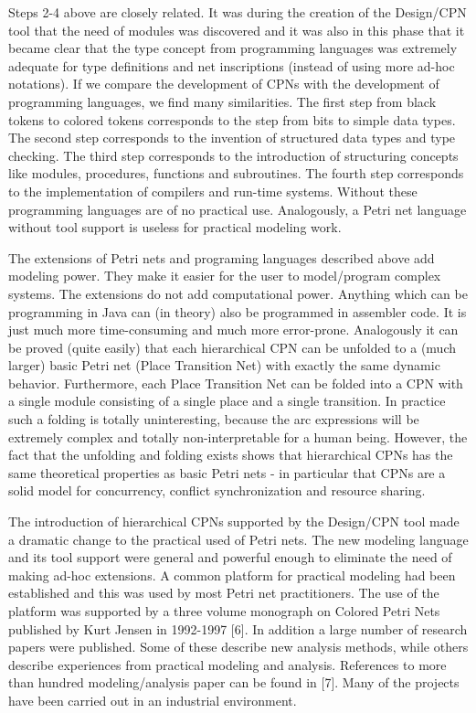 Steps 2-4 above are closely related. It was during the creation of the
Design/CPN tool that the need of modules was discovered and it was
also in this phase that it became clear that the type concept from
programming languages was extremely adequate for type definitions and
net inscriptions (instead of using more ad-hoc notations). If we
compare the development of CPNs with the development of programming
languages, we find many similarities. The first step from black tokens
to colored tokens corresponds to the step from bits to simple data
types. The second step corresponds to the invention of structured data
types and type checking. The third step corresponds to the
introduction of structuring concepts like modules, procedures,
functions and subroutines. The fourth step corresponds to the
implementation of compilers and run-time systems. Without these
programming languages are of no practical use. Analogously, a Petri
net language without tool support is useless for practical modeling
work.

The extensions of Petri nets and programing languages described above
add modeling power. They make it easier for the user to model/program
complex systems. The extensions do not add computational
power. Anything which can be programming in Java can (in theory) also
be programmed in assembler code. It is just much more time-consuming
and much more error-prone. Analogously it can be proved (quite easily)
that each hierarchical CPN can be unfolded to a (much larger) basic
Petri net (Place Transition Net) with exactly the same dynamic
behavior. Furthermore, each Place Transition Net can be folded into a
CPN with a single module consisting of a single place and a single
transition. In practice such a folding is totally uninteresting,
because the arc expressions will be extremely complex and totally
non-interpretable for a human being. However, the fact that the
unfolding and folding exists shows that hierarchical CPNs has the same
theoretical properties as basic Petri nets - in particular that CPNs
are a solid model for concurrency, conflict synchronization and
resource sharing.

The introduction of hierarchical CPNs supported by the Design/CPN tool
made a dramatic change to the practical used of Petri nets. The new
modeling language and its tool support were general and powerful
enough to eliminate the need of making ad-hoc extensions. A common
platform for practical modeling had been established and this was used
by most Petri net practitioners. The use of the platform was supported
by a three volume monograph on Colored Petri Nets published by Kurt
Jensen in 1992-1997 [6]. In addition a large number of research papers
were published. Some of these describe new analysis methods, while
others describe experiences from practical modeling and
analysis. References to more than hundred modeling/analysis paper can
be found in [7]. Many of the projects have been carried out in an
industrial environment.
 
